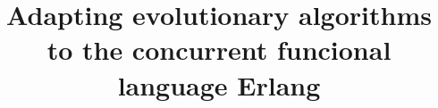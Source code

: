 \documentclass{acm_proc_article-sp}
\begin{document}
\title{Adapting evolutionary algorithms to the concurrent funcional language Erlang}

%
%
%
%
%
\end{document}

